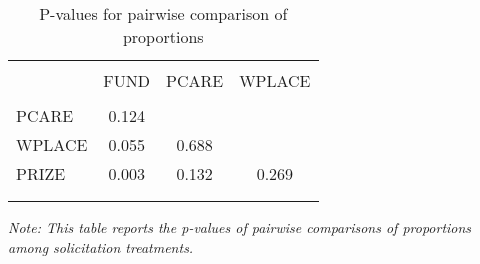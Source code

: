 \begin{table}
\centering
\caption{P-values for pairwise comparison of proportions}
\label{pairwise}
\begin{tabular}{@{}lccc}
  \\[-1.8ex]\hline \hline \\[-1.8ex]
 & FUND & PCARE & WPLACE \\ 
  \hline \\[-1.86ex]
PCARE & 0.124 &  &  \\ 
  WPLACE & 0.055 & 0.688 &  \\ 
  PRIZE & 0.003 & 0.132 & 0.269 \\ 
   \\[-1.8ex]\hline \hline \\[-1.8ex]
\end{tabular}
\begin{minipage}{\textwidth}\itshape\footnotesize
Note: This table reports the p-values of pairwise comparisons of proportions
						         among solicitation treatments.
\end{minipage}
\end{table}
